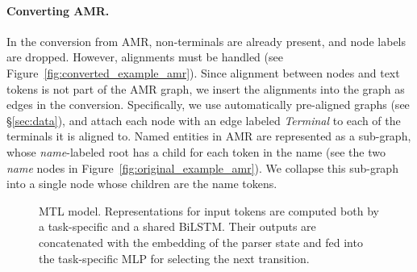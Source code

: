 \documentclass[11pt,a4paper]{article}
\begin{document}
\paragraph{Converting AMR.}
In the conversion from AMR, non-terminals are already present, and node labels are dropped.
However, alignments must be handled (see Figure~\ref{fig:converted_example_amr}).
Since alignment between nodes and text tokens is not part of the AMR graph,
we insert the alignments into the graph as edges in the conversion.
Specifically, we use automatically pre-aligned graphs (see \S\ref{sec:data}),
and attach each node with an edge labeled \textit{Terminal} to each of the terminals it is aligned to.
%
Named entities in AMR are represented as a sub-graph, whose \textit{name}-labeled root
has a child for each token in the name (see the two \textit{name} nodes in Figure~\ref{fig:original_example_amr}).
We collapse this sub-graph into a single node whose children are the name tokens.


\begin{figure}[t]
   \caption{MTL model.
      Representations for input tokens are computed both by a task-specific and a shared BiLSTM.
      Their outputs are concatenated with the embedding of the parser state and fed into the task-specific MLP for selecting the next transition.}
   \label{fig:multi_model}
\end{figure}
\end{document}
